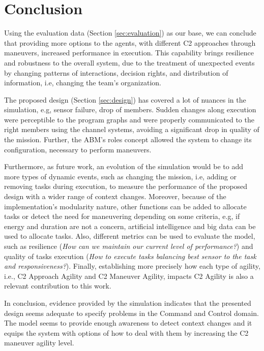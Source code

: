 \section{Conclusion}
\label{sec:conclusion}

Using the evaluation data (Section \ref{sec:evaluation}) as our base, we can conclude that providing more options to the agents, with different C2 approaches through maneuvers, increased performance in execution. This capability brings resilience and robustness to the overall system, due to the treatment of unexpected events by changing patterns of interactions, decision rights, and distribution of information, i.e, changing the team's organization.

The proposed design (Section \ref{sec:design}) has covered a lot of nuances in the simulation, e.g, sensor failure, drop of members. Sudden changes along execution were perceptible to the program graphs and were properly communicated to the right members using the channel systems, avoiding a significant drop in quality of the mission. Further, the ABM's roles concept allowed the system to change its configuration, necessary to perform maneuvers.

Furthermore, as future work, an evolution of the simulation would be to add more types of dynamic events, such as changing the mission, i.e, adding or removing tasks during execution, to measure the performance of the proposed design with a wider range of context changes. Moreover, because of the implementation's modularity nature, other functions can be added to allocate tasks or detect the need for maneuvering depending on some criteria, e.g, if energy and duration are not a concern, artificial intelligence and big data can be used to allocate tasks. Also, different metrics can be used to evaluate the model, such as resilience (\textit{How can we maintain our current level of performance?}) and quality of tasks execution (\textit{How to execute tasks balancing best sensor to the task and responsiveness?}). Finally, establishing more precisely how each type of agility, i.e., C2 Approach Agility and C2 Maneuver Agility, impacts C2 Agility is also a relevant contribution to this work.

In conclusion, evidence provided by the simulation indicates that the presented design seems adequate to specify problems in the Command and Control domain. The model seems to provide enough awareness to detect context changes and it equips the system with options of how to deal with them by increasing the C2 maneuver agility level.